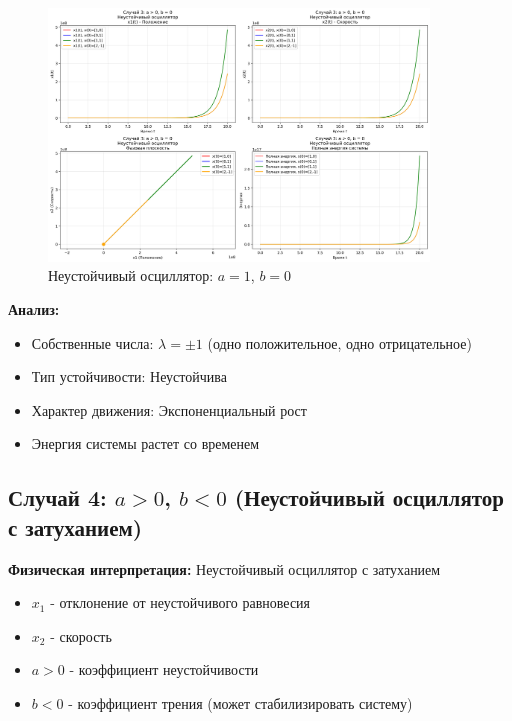 \begin{figure}[H]
    \centering
    \includegraphics[width=0.9\textwidth]{images/task3/oscillator_case3_unstable.png}
    \caption{Неустойчивый осциллятор: $a = 1$, $b = 0$}
\end{figure}

\textbf{Анализ:}
\begin{itemize}
    \item Собственные числа: $\lambda = \pm 1$ (одно положительное, одно отрицательное)
    \item Тип устойчивости: Неустойчива
    \item Характер движения: Экспоненциальный рост
    \item Энергия системы растет со временем
\end{itemize}

\subsection*{Случай 4: $a > 0$, $b < 0$ (Неустойчивый осциллятор с затуханием)}

\textbf{Физическая интерпретация:} Неустойчивый осциллятор с затуханием

\begin{itemize}
    \item $x_1$ - отклонение от неустойчивого равновесия
    \item $x_2$ - скорость
    \item $a > 0$ - коэффициент неустойчивости
    \item $b < 0$ - коэффициент трения (может стабилизировать систему)
\end{itemize}

